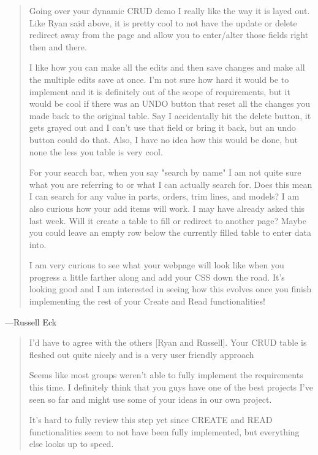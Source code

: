 \documentclass[11pt,letterpaper,oneside]{amsart}
\begin{document}
\begin{tcolorbox} \begin{quotation}

Going over your dynamic CRUD demo I really like the way it is layed out. Like Ryan said above, it is pretty cool to not have the update or delete redirect away from the page and allow you to enter/alter those fields right then and there.

I like how you can make all the edits and then save changes and make all the multiple edits save at once. I'm not sure how hard it would be to implement and it is definitely out of the scope of requirements, but it would be cool if there was an UNDO button that reset all the changes you made back to the original table. Say I accidentally hit the delete button, it gets grayed out and I can't use that field or bring it back, but an undo button could do that. Also, I have no idea how this would be done, but none the less you table is very cool.

For your search bar, when you say "search by name" I am not quite sure what you are referring to or what I can actually search for. Does this mean I can search for any value in parts, orders, trim lines, and models? I am also curious how your add items will work. I may have already asked this last week. Will it create a table to fill or redirect to another page? Maybe you could leave an empty row below the currently filled table to enter data into.

I am very curious to see what your webpage will look like when you progress a little farther along and add your CSS down the road. It's looking good and I am interested in seeing how this evolves once you finish implementing the rest of your Create and Read functionalities!

\end{quotation} \end{tcolorbox}
    
---Russell Eck

\begin{tcolorbox} \begin{quotation}
I'd have to agree with the others [Ryan and Russell]. Your CRUD table is fleshed out quite nicely and is a very user friendly approach

Seems like most groups weren't able to fully implement the requirements this time. I definitely think that you guys have one of the best projects I've seen so far and might use some of your ideas in our own project.

It's hard to fully review this step yet since CREATE and READ functionalities seem to not have been fully implemented, but everything else looks up to speed.

\end{quotation} \end{tcolorbox}
    
\end{document}
